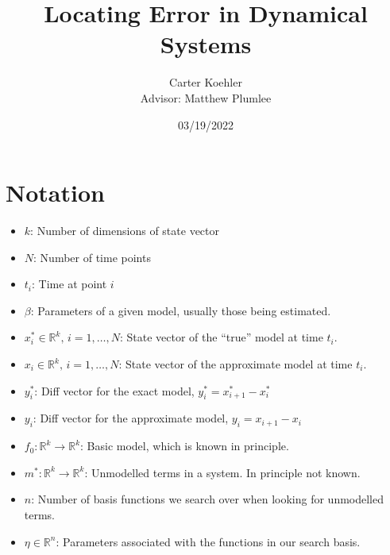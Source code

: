 \documentclass[12pt]{article}
\author{Carter Koehler\\{\small Advisor: Matthew Plumlee}}
\title{Locating Error in Dynamical Systems}
\date{03/19/2022}
\begin{document}
\maketitle



\begin{abstract}
  
\end{abstract}


\section{Notation}

\begin{itemize}

\item
  $k$: Number of dimensions of state vector

\item
  $N$: Number of time points

\item
  $t_i$: Time at point $i$

\item
  $\beta$: Parameters of a given model, usually those being estimated.
  
\item
  $x_i^* \in \mathbb{R}^k,\, i=1,\ldots, N$: State vector of the ``true'' model at time $t_i$. 

\item
  $x_i \in \mathbb{R}^k,\, i=1,\ldots, N$: State vector of the approximate model at time $t_i$. 

\item
  $y_i^*$: Diff vector for the exact model, $y_i^* = x_{i+1}^* - x_i^*$
  
\item
  $y_i$: Diff vector for the approximate model, $y_i = x_{i+1} - x_i$

\item
  $f_0: \mathbb{R}^k \to \mathbb{R}^k$: Basic model, which is known in principle.


\item
  $m^*: \mathbb{R}^k \to \mathbb{R}^k$: Unmodelled terms in a system. In principle not known.
  
\item
  $n$: Number of basis functions we search over when looking for unmodelled terms.
  
\item
  $\eta \in \mathbb{R}^n$: Parameters associated with the functions in our search basis.

\end{itemize}
\end{document}
